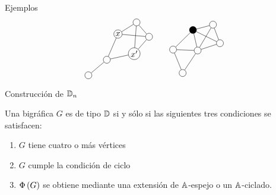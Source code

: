 \documentclass[spanish]{beamer}
\begin{document}
\begin{frame}{Ejemplos}
  \begin{equation*}
  \begin{tikzpicture}[baseline = (current bounding box.center), every 
  node/.style={inner sep=3pt, draw, circle}]
  \node[inner sep=1pt] (v1) at (-0.17702807361217932, 
  0.2169077993202585) {$x$};
  \node[inner sep=1pt] (v2) at (0.5094847697505441, 
  -0.6140803384090112) {$x^\prime$};
  \node (v3) at (0.6069997477997765, 0.7096309089544152) {};
  \node (v4) at (1.1343769499172704, 0.10036276119312261) {};
  \node (v5) at (-0.648145832261598, -0.8701436995030774) {};
  \node (v6) at (-1.4270078527724706, -1.5265337186469214) {};
  \draw (v1) -- (v3);
  \draw (v1) -- (v4);
  \draw (v1) -- (v5);
  \draw (v2) -- (v3);
  \draw (v2) -- (v4);
  \draw (v2) -- (v5);
  \draw (v3) -- (v4);
  \draw (v5) -- (v6);
  \end{tikzpicture}
  \qquad
  \begin{tikzpicture}[baseline = (current bounding box.center), every 
  node/.style={inner sep=3pt, draw, circle}]
  \node (v1) at (-0.2814306111671281, 0.8990219271931051) {};
  \node (v2) at (0.75691323601581, 0.8600382799848384) {};
  \node[fill = black, text = white] (v3) at (0.5586925858271716, 
  1.7274992556341786) {};
  \node (v4) at (1.6988576401743483, 1.1678621669884481) {};
  \node (v5) at (1.4035768281579486, 1.9530041708564487) {};
  \node (v6) at (0.12280539183944258, -0.09186288489949457) {};
  \draw (v1) -- (v2);
  \draw (v1) -- (v3);
  \draw (v1) -- (v6);
  \draw (v2) -- (v3);
  \draw (v2) -- (v4);
  \draw (v2) -- (v5);
  \draw (v2) -- (v6);
  \draw (v3) -- (v4);
  \draw (v3) -- (v5);
  \draw (v4) -- (v5);
  \end{tikzpicture}
  \end{equation*}
\end{frame}

\begin{frame}{Construcción de $\mathbb{D}_n$}
  \begin{theorem}[M. Barot - 2001]
    Una bigráfica $G$ es de tipo $\mathbb{D}$ si y sólo si las siguientes tres 
    condiciones se satisfacen:
    \begin{enumerate}[<+->]
      \item $G$ tiene cuatro o más vértices
      \item $G$ cumple la condición de ciclo
      \item $\Phi\left({G}\right)$ se obtiene mediante una extensión de 
      $\mathbb{A}$-espejo o un $\mathbb{A}$-ciclado.
    \end{enumerate}
  \end{theorem}
\end{frame}
\end{document}
